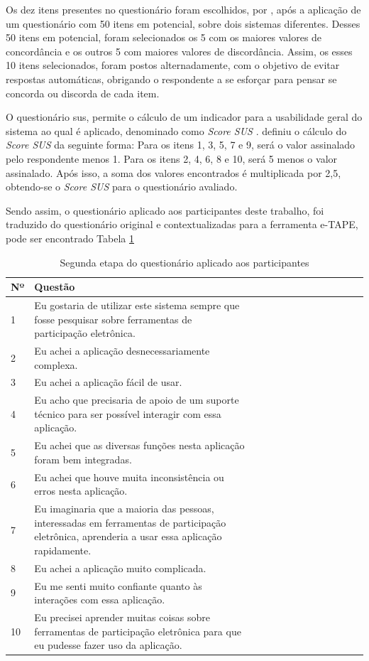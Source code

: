\par
Os dez itens presentes no questionário foram escolhidos, por , após a aplicação de um questionário com 50 itens em potencial, sobre dois sistemas diferentes. 
Desses 50 itens em potencial, foram selecionados os 5 com os maiores valores de concordância e os outros 5 com maiores valores de discordância. Assim, os esses 10 itens selecionados,
foram postos alternadamente, com o objetivo de evitar respostas automáticas, obrigando o respondente a se esforçar para pensar se concorda ou discorda de cada item. 

\par
O questionário \acrshort{sus}, permite o cálculo de um indicador para a usabilidade geral do sistema ao qual é aplicado, denominado como \textit{Score SUS} . 
 definiu o cálculo do \textit{Score SUS} da seguinte forma:
Para os itens 1, 3, 5, 7 e 9, será o valor assinalado pelo respondente menos 1. Para os itens 2, 4, 6, 8 e 10, será 5 menos o valor assinalado. Após isso, a soma dos valores 
encontrados é multiplicada por 2,5, obtendo-se o \textit{Score SUS} para o questionário avaliado.

\par
Sendo assim, o questionário aplicado aos participantes deste trabalho, foi traduzido do questionário original e contextualizadas para a ferramenta e-TAPE,
pode ser encontrado Tabela \ref{tab:questionario3}

\begin{table}[!ht]
    \centering
    \caption{Segunda etapa do questionário aplicado aos participantes}
    \label{tab:questionario3}
    \begin{tabular}{l*{2}{>{\raggedright\arraybackslash}p{0.66\linewidth}}}
    \toprule
    Nº & Questão        \\
    \midrule
    1 & Eu gostaria de utilizar este sistema sempre que fosse pesquisar sobre ferramentas de participação eletrônica.\\
    2 & Eu achei a aplicação desnecessariamente complexa. \\
    3 & Eu achei a aplicação fácil de usar.\\
    4 & Eu acho que precisaria de apoio de um suporte técnico para ser possível interagir com essa aplicação.\\
    5 & Eu achei que as diversas funções nesta aplicação foram bem integradas. \\
    6 & Eu achei que houve muita inconsistência ou erros nesta aplicação. \\
    7 & Eu imaginaria que a maioria das pessoas, interessadas em ferramentas de participação eletrônica, aprenderia a usar essa aplicação rapidamente. \\
    8 & Eu achei a aplicação muito complicada. \\
    9 & Eu me senti muito confiante quanto às interações com essa aplicação. \\
    10 & Eu precisei aprender muitas coisas sobre ferramentas de participação eletrônica para que eu pudesse fazer uso da aplicação.\\
    \bottomrule
    \end{tabular}
\end{table}


